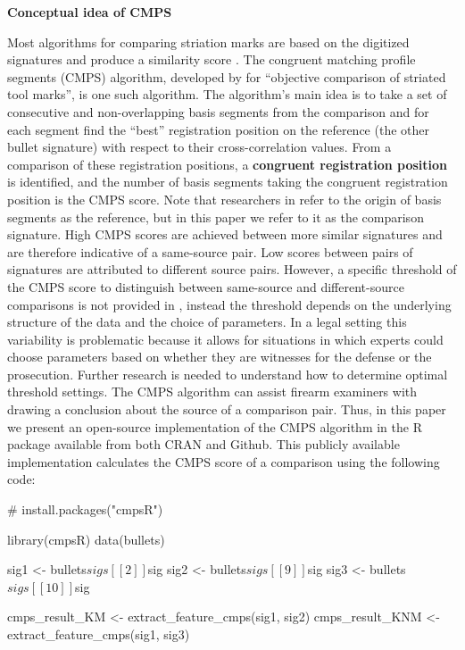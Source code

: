 \textbf{Conceptual idea of CMPS}

Most algorithms for comparing striation marks are based on the digitized
signatures and produce a similarity score
\citep[\citet{ChumbleyL_Scott2010VoTM}, \citet{aoas},
\citet{pmid30444940}]{song2005}. The congruent matching profile segments
(CMPS) algorithm, developed by \citet{cmps} for ``objective comparison
of striated tool marks'', is one such algorithm. The algorithm's main
idea is to take a set of consecutive and non-overlapping basis segments
from the comparison and for each segment find the ``best'' registration
position on the reference (the other bullet signature) with respect to
their cross-correlation values. From a comparison of these registration
positions, a \textbf{congruent registration position} is identified, and
the number of basis segments taking the congruent registration position
is the CMPS score. Note that researchers in \citet{cmps} refer to the
origin of basis segments as the reference, but in this paper we refer to
it as the comparison signature. High CMPS scores are achieved between
more similar signatures and are therefore indicative of a same-source
pair. Low scores between pairs of signatures are attributed to different
source pairs. However, a specific threshold of the CMPS score to
distinguish between same-source and different-source comparisons is not
provided in \citet{cmps}, instead the threshold depends on the
underlying structure of the data and the choice of parameters. In a
legal setting this variability is problematic because it allows for
situations in which experts could choose parameters based on whether
they are witnesses for the defense or the prosecution. Further research
is needed to understand how to determine optimal threshold settings. The
CMPS algorithm can assist firearm examiners with drawing a conclusion
about the source of a comparison pair. Thus, in this paper we present an
open-source implementation of the CMPS algorithm in the R package
 available from both CRAN and Github. This publicly available
implementation calculates the CMPS score of a comparison using the
following code:

\begin{Schunk}
\begin{Sinput}
# install.packages("cmpsR")

library(cmpsR)
data(bullets)

sig1 <- bullets$sigs[[2]]$sig
sig2 <- bullets$sigs[[9]]$sig
sig3 <- bullets$sigs[[10]]$sig

cmps_result_KM <- extract_feature_cmps(sig1, sig2)
cmps_result_KNM <- extract_feature_cmps(sig1, sig3)
\end{Sinput}
\end{Schunk}

